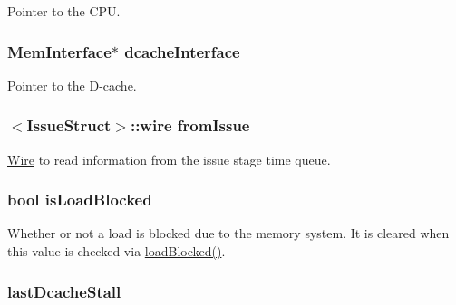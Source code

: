 \label{classOzoneLSQ_a766385c2941cd46525f4d9dff90200a2}
Pointer to the CPU. \hypertarget{classOzoneLSQ_a22dc8294eecb144fbdd951d2e32e9330}{
\subsubsection[{dcacheInterface}]{\setlength{\rightskip}{0pt plus 5cm}MemInterface$\ast$ {\bf dcacheInterface}}}
\label{classOzoneLSQ_a22dc8294eecb144fbdd951d2e32e9330}
Pointer to the D-\/cache. \hypertarget{classOzoneLSQ_af6f43373b6586aa8c486538fb076effb}{
\subsubsection[{fromIssue}]{$<${\bf IssueStruct}$>$::wire {\bf fromIssue}}}
\label{classOzoneLSQ_af6f43373b6586aa8c486538fb076effb}
\hyperlink{classWire}{Wire} to read information from the issue stage time queue. \hypertarget{classOzoneLSQ_a95dc31b4ce3ebcb6b9d75a510b3a128c}{
\subsubsection[{isLoadBlocked}]{\setlength{\rightskip}{0pt plus 5cm}bool {\bf isLoadBlocked}}}
\label{classOzoneLSQ_a95dc31b4ce3ebcb6b9d75a510b3a128c}
Whether or not a load is blocked due to the memory system. It is cleared when this value is checked via \hyperlink{classOzoneLSQ_a05c413ba417c6453e99f75d87c958590}{loadBlocked()}. \hypertarget{classOzoneLSQ_a8b4696062ef09ab956804a7a99491853}{
\subsubsection[{lastDcacheStall}]{ {\bf lastDcacheStall}}}
